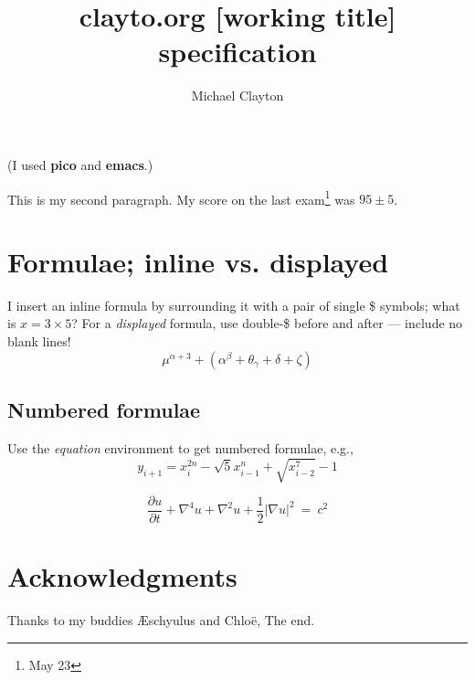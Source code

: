 \documentclass[12pt]{article}
\title{clayto.org [working title] specification}         %
\author{Michael Clayton}      %
\begin{document}
\maketitle                      %

(I used \textbf{pico} and \textbf{emacs}.)

This is my second paragraph.
My score on the last exam\footnote{May 23} was $95 \pm 5$.

\section{Formulae; inline vs. displayed}

I insert an inline formula by surrounding it with a pair of
single \$ symbols;  what is $x = 3 \times 5$?
For a \emph{displayed} formula, use double-\$
before and after --- include no blank lines!
$$\mu^{\alpha+3} + (\alpha^{\beta}+\theta_{\gamma}+\delta+\zeta)$$

\subsection{Numbered formulae}

Use the \emph{equation} environment to get numbered formulae, e.g.,
\begin{equation}
    y_{i+1} = x_{i}^{2n} - \sqrt{5}x_{i-1}^{n} + \sqrt{x_{i-2}^7} -1
\end{equation}

\begin{equation}
    \frac{\partial u}{\partial t} + \nabla^{4}u + \nabla^{2}u +
        \frac12    |\nabla u|^{2}~ =~ c^2
\end{equation}

\section{Acknowledgments}

Thanks to my buddies {\AE}schyulus and Chlo\"{e},
The end.
\end{document}
